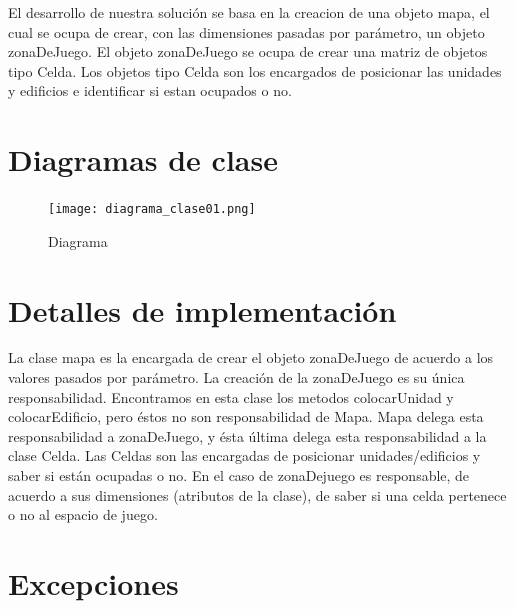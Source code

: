 \documentclass[titlepage,a4paper]{article}
\begin{document}
El desarrollo de nuestra solución se basa en la creacion de una objeto mapa, el cual se ocupa de crear, con las dimensiones pasadas por parámetro, un objeto zonaDeJuego. El objeto zonaDeJuego se ocupa de crear una matriz de objetos tipo Celda. Los objetos tipo Celda son los encargados de posicionar las unidades y edificios e identificar si estan ocupados o no. 


\section{Diagramas de clase}\label{sec:diagramasdeclase}



\begin{figure}[H]
\centering
\texttt{[image: diagrama\_clase01.png]}
\caption{\label{fig:class01}Diagrama}
\end{figure}

\section{Detalles de implementación}\label{sec:implementacion}
La clase mapa es la encargada de crear el objeto zonaDeJuego de acuerdo a los valores pasados por parámetro. La creación de la zonaDeJuego es su única responsabilidad. Encontramos en esta clase los metodos colocarUnidad y colocarEdificio, pero éstos no son responsabilidad de Mapa. Mapa delega esta responsabilidad a zonaDeJuego, y ésta última delega esta responsabilidad a la clase Celda. Las Celdas son las encargadas de posicionar unidades/edificios y saber si están ocupadas o no. En el caso de zonaDejuego es responsable, de acuerdo a sus dimensiones (atributos de la clase), de saber si una celda pertenece o no al espacio de juego.



\section{Excepciones}\label{sec:excepciones}
\end{document}
